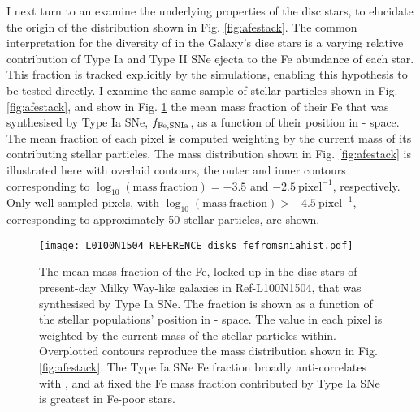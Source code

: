 I next turn to an examine the underlying properties of the disc stars, to elucidate the origin of the distribution shown in Fig. \ref{fig:afestack}. The common interpretation for the diversity of \afe{} in the Galaxy's disc stars is a varying relative contribution of Type Ia and Type II SNe ejecta to the Fe abundance of each star. This fraction is tracked explicitly by the simulations, enabling this hypothesis to be tested directly. I examine the same sample of stellar particles shown in Fig. \ref{fig:afestack}, and show in Fig. \ref{fig:afesniafrac} the mean mass fraction of their Fe that was synthesised by Type Ia SNe, $f_{\rm Fe,SNIa}$, as a function of their position in \afe{}-\feh{} space. The mean fraction of each pixel is computed weighting by the current mass of its contributing stellar particles. The mass distribution shown in Fig. \ref{fig:afestack} is illustrated here with overlaid contours, the outer and inner contours corresponding to $\log_{10}{(\mathrm{mass\ fraction})} = -3.5$ and $-2.5\ \mathrm{pixel^{-1}}$, respectively. Only well sampled pixels, with $\log_{10}{(\mathrm{mass\ fraction})} > -4.5\ \mathrm{pixel^{-1}}$, corresponding to approximately 50 stellar particles, are shown.

\begin{figure}
\texttt{[image: L0100N1504\_REFERENCE\_disks\_fefromsniahist.pdf]}
\caption[Two-dimensional histogram showing the mean mass fraction of stellar Fe which was ejected by Type Ia SNe, as a function of \afe{} and \feh{} for Ref-L100N1504 disk stars]{\label{fig:afesniafrac} The mean mass fraction of the Fe, locked up in the disc stars of present-day Milky Way-like galaxies in Ref-L100N1504, that was synthesised by Type Ia SNe. The fraction is shown as a function of the stellar populations' position in \afe{}-\feh{} space. The value in each  pixel is weighted by the current mass of the stellar particles within. Overplotted contours reproduce the mass distribution shown in Fig. \ref{fig:afestack}. The Type Ia SNe Fe fraction broadly anti-correlates with \afe{}, and at fixed \afe{} the Fe mass fraction contributed by Type Ia SNe is greatest in Fe-poor stars.}
\end{figure}


